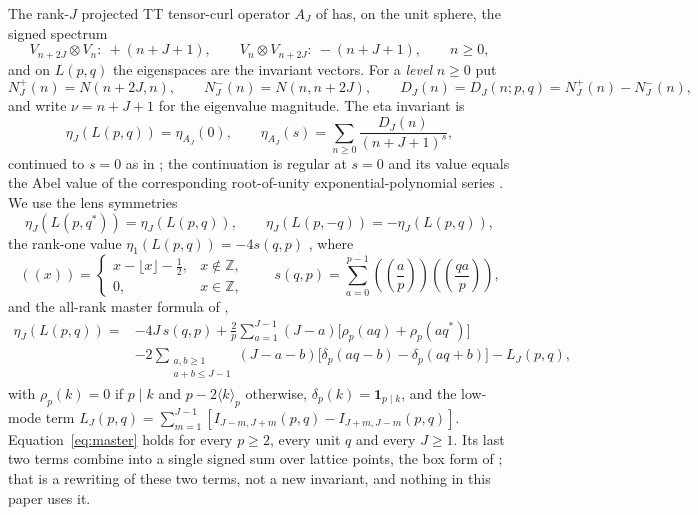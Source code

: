 \documentclass[11pt]{article}
\theoremstyle{definition}
\newcommand{\Z}{\mathbb Z}
\newcommand{\ind}{\mathbf 1}
\newcommand{\sawtooth}[1]{\left(\!\left(#1\right)\!\right)}
\begin{document}
The rank-$J$ projected TT tensor-curl operator $A_J$ of
\cite[Thm.~3.1]{MahmoodP1Collection2026} has, on the unit sphere, the
signed spectrum
\[
 V_{n+2J}\otimes V_n:\ +(n+J+1),\qquad
 V_n\otimes V_{n+2J}:\ -(n+J+1),\qquad n\geq0,
\]
and on $L(p,q)$ the eigenspaces are the invariant vectors.  For a
\emph{level} $n\geq0$ put
\begin{equation}
 N^+_J(n)=N(n+2J,n),\qquad N^-_J(n)=N(n,n+2J),\qquad
 D_J(n)=D_J(n;p,q)=N^+_J(n)-N^-_J(n),
 \label{eq:branch-counts}
\end{equation}
and write $\nu=n+J+1$ for the eigenvalue magnitude.  The eta invariant is
\begin{equation}
 \eta_J(L(p,q))=\eta_{A_J}(0),\qquad
 \eta_{A_J}(s)=\sum_{n\geq0}\frac{D_J(n)}{(n+J+1)^s},
 \label{eq:eta-def}
\end{equation}
continued to $s=0$ as in \cite[Prop.~4.1]{MahmoodP1Collection2026}; the
continuation is regular at $s=0$ and its value equals the Abel value of
the corresponding root-of-unity exponential-polynomial series
\cite[Lem.~5.4]{MahmoodP1Collection2026}.  We use the lens symmetries
\begin{equation}
 \eta_J(L(p,q^*))=\eta_J(L(p,q)),\qquad
 \eta_J(L(p,-q))=-\eta_J(L(p,q)),
 \label{eq:lens-symmetries}
\end{equation}
the rank-one value $\eta_1(L(p,q))=-4s(q,p)$
\cite[Cor.~5.8]{MahmoodP1Collection2026}, where
\[
 \sawtooth{x}=
 \begin{cases}x-\lfloor x\rfloor-\tfrac12,&x\notin\Z,\\0,&x\in\Z,\end{cases}
 \qquad
 s(q,p)=\sum_{a=0}^{p-1}\sawtooth{\frac ap}\sawtooth{\frac{qa}p},
\]
and the all-rank master formula of \cite[Thm.~5.1]{MahmoodP1Collection2026},
\begin{align}
 \eta_J(L(p,q))={}&-4J\,s(q,p)
 +\frac2p\sum_{a=1}^{J-1}(J-a)\bigl[\rho_p(aq)+\rho_p(aq^*)\bigr]\nonumber\\
 &-2\!\!\sum_{\substack{a,b\geq1\\a+b\leq J-1}}\!\!(J-a-b)
 \bigl[\delta_p(aq-b)-\delta_p(aq+b)\bigr]
 -L_J(p,q),
 \label{eq:master}
\end{align}
with $\rho_p(k)=0$ if $p\mid k$ and $p-2\langle k\rangle_p$ otherwise,
$\delta_p(k)=\ind_{p\mid k}$, and the low-mode term
$L_J(p,q)=\sum_{m=1}^{J-1}[I_{J-m,J+m}(p,q)-I_{J+m,J-m}(p,q)]$.
Equation~\eqref{eq:master} holds for every $p\geq2$, every unit $q$ and
every $J\geq1$.  Its last two terms combine into a single signed sum
over lattice points, the box form of
\cite[Lem.~8.1]{SilverRankZeros2026}; that is a rewriting of these two
terms, not a new invariant, and nothing in this paper uses it.
\end{document}
